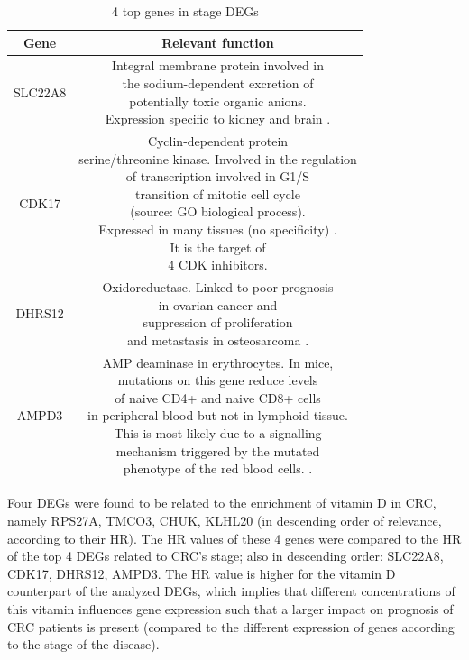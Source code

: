 \documentclass[fleqn,10pt]{SelfArx} %
\begin{document}
\begin{table}[ht]
	\small
	\centering
	\begin{tabular}{cc}
		\hline
		Gene & Relevant function\\
		\hline
		SLC22A8 & \makecell{Integral membrane protein involved in\\the sodium-dependent excretion of\\potentially toxic organic anions.\\Expression specific to kidney and brain \cite{e}.}\\
		CDK17 & \makecell{Cyclin-dependent protein \\serine/threonine kinase. Involved in the regulation \\of transcription involved in G1/S\\transition of mitotic cell cycle\\(source: GO biological process).\\Expressed in many tissues (no specificity) \cite{b}.\\It is the target of\\4 CDK inhibitors.}\\
		DHRS12 & \makecell{Oxidoreductase. Linked to poor prognosis\\in ovarian cancer \cite{c} and\\suppression of proliferation\\and metastasis in osteosarcoma \cite{d}.}\\
		AMPD3 & \makecell{AMP deaminase in erythrocytes. In mice,\\mutations on this gene reduce levels\\of naive CD4+ and naive CD8+ cells\\in peripheral blood but not in lymphoid tissue.\\This is most likely due to a signalling\\mechanism triggered by the mutated\\phenotype of the red blood cells. \cite{a}.}\\
		\hline
	\end{tabular}
	\caption{4 top genes in stage DEGs}
	\label{tab:deg_char}
\end{table}
Four DEGs were found to be related to the enrichment of vitamin D in CRC, namely RPS27A, TMCO3, CHUK, KLHL20 (in descending order of relevance, according to their HR). The HR values of these 4 genes were compared to the HR of the top 4 DEGs related to CRC’s stage; also in descending order: SLC22A8, CDK17, DHRS12, AMPD3. The HR value is higher for the vitamin D counterpart of the analyzed DEGs, which implies that different concentrations of this vitamin influences gene expression such that a larger impact on prognosis of CRC patients is present (compared to the different expression of genes according to the stage of the disease).
\end{document}
